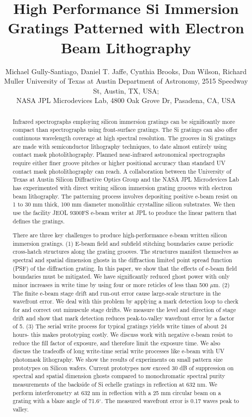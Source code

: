 \documentclass[]{spie}  %
\title{High Performance Si Immersion Gratings Patterned with Electron Beam Lithography}
\author{Michael Gully-Santiago\supit{a}, Daniel T. Jaffe\supit{a}, Cynthia Brooks\supit{a}, Dan Wilson\supit{b}, Richard Muller\supit{b}
\skiplinehalf
\supit{a}University of Texas at Austin Department of Astronomy, 2515 Speedway St, Austin, TX, USA; \\
\supit{b}NASA JPL Microdevices Lab, 4800 Oak Grove Dr, Pasadena, CA, USA
}
\begin{document}
 
  \maketitle 

\begin{abstract}
Infrared spectrographs employing silicon immersion gratings can be significantly more compact than spectrographs using front-surface gratings.  The Si gratings can also offer continuous wavelength coverage at high spectral resolution.  The grooves in Si gratings are made with semiconductor lithography techniques, to date almost entirely using contact mask photolithography.  Planned near-infrared astronomical spectrographs require either finer groove pitches or higher positional accuracy than standard UV contact mask photolithography can reach.  A collaboration between the University of Texas at Austin Silicon Diffractive Optics Group and the NASA JPL Microdevices Lab has experimented with direct writing silicon immersion grating grooves with electron beam lithography.  The patterning process involves depositing positive e-beam resist on 1 to 30 mm thick, 100 mm diameter monolithic crystalline silicon substrates.  We then use the facility JEOL 9300FS e-beam writer at JPL to produce the linear pattern that defines the gratings.

There are three key challenges to produce high-performance e-beam written silicon immersion gratings.  (1) E-beam field and subfield stitching boundaries cause periodic cross-hatch structures along the grating grooves.   The structures manifest themselves as spectral and spatial dimension ghosts in the diffraction limited point spread function (PSF) of the diffraction grating.  In this paper, we show that the effects of e-beam field boundaries must be mitigated.  We have significantly reduced ghost power with only minor increases in write time by using four or more reticles of less than 500 $\mu$m. (2) The finite e-beam stage drift and run-out error cause large-scale structure in the wavefront error.  We deal with this problem by applying a mark detection loop to check for and correct out minuscule stage drifts.  We measure the level and direction of stage drift and show that mark detection reduces peak-to-valley wavefront error by a factor of 5. (3) The serial write process for typical gratings yields write times of about 24 hours- this makes prototyping costly.  We discuss work with negative e-beam resist to reduce the fill factor of exposure, and therefore limit the exposure time.
We also discuss the tradeoffs of long write-time serial write processes like e-beam with UV photomask lithography.  We show the results of experiments on small pattern size prototypes on Silicon wafers.  Current prototypes now exceed 30 dB of suppression on spectral and spatial dimension ghosts compared to monochromatic spectral purity measurements of the backside of Si echelle gratings in reflection at 632 nm.  We perform interferometry at 632 nm in reflection with a 25 mm circular beam on a grating with a blaze angle of 71.6$^\circ$.  The measured wavefront error is 0.17 waves peak to valley.
\end{abstract}
\end{document}
